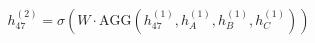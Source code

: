 \documentclass[preview]{standalone}
\begin{document}
\begin{align*}
h_{47}^{(2)} = \sigma\left(W \cdot \text{AGG}(h_{47}^{(1)}, h_A^{(1)}, h_B^{(1)}, h_C^{(1)})\right)
\end{align*}
\end{document}
